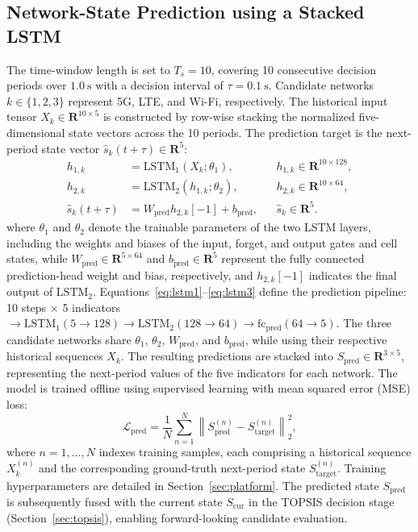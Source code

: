 \documentclass[preprint,12pt]{elsarticle}
\begin{document}
\subsection{Network-State Prediction using a Stacked LSTM}\label{sec:pred}

The time-window length is set to $T_s=10$, covering 10 consecutive decision periods over $1.0~\mathrm{s}$ with a decision interval of $\tau=0.1~\mathrm{s}$. Candidate networks $k\in\{1,2,3\}$ represent 5G, LTE, and Wi-Fi, respectively. The historical input tensor $X_k\in\mathbf{R}^{10\times5}$ is constructed by row-wise stacking the normalized five-dimensional state vectors across the 10 periods. The prediction target is the next-period state vector $\hat{s}_k(t+\tau)\in\mathbf{R}^5$:
\begin{align}
h_{1,k} &= \mathrm{LSTM}_1(X_k;\theta_1), && h_{1,k}\in\mathbf{R}^{10\times128}, \label{eq:lstm1}\\
h_{2,k} &= \mathrm{LSTM}_2(h_{1,k};\theta_2), && h_{2,k}\in\mathbf{R}^{10\times64}, \label{eq:lstm2}\\
\hat{s}_k(t+\tau) &= W_{\mathrm{pred}}h_{2,k}[-1]+b_{\mathrm{pred}}, && \hat{s}_k\in\mathbf{R}^5. \label{eq:lstm3}
\end{align}
where $\theta_1$ and $\theta_2$ denote the trainable parameters of the two LSTM layers, including the weights and biases of the input, forget, and output gates and cell states, while $W_{\mathrm{pred}}\in\mathbf{R}^{5\times64}$ and $b_{\mathrm{pred}}\in\mathbf{R}^5$ represent the fully connected prediction-head weight and bias, respectively, and $h_{2,k}[-1]$ indicates the final output of $\mathrm{LSTM}_2$. Equations~\eqref{eq:lstm1}--\eqref{eq:lstm3} define the prediction pipeline: 10 steps $\times$ 5 indicators $\rightarrow\mathrm{LSTM}_1(5\rightarrow128)\rightarrow\mathrm{LSTM}_2(128\rightarrow64)\rightarrow\mathrm{fc}_{\mathrm{pred}}(64\rightarrow5)$. The three candidate networks share $\theta_1$, $\theta_2$, $W_{\mathrm{pred}}$, and $b_{\mathrm{pred}}$, while using their respective historical sequences $X_k$. The resulting predictions are stacked into $S_{\mathrm{pred}}\in\mathbf{R}^{3\times5}$, representing the next-period values of the five indicators for each network. The model is trained offline using supervised learning with mean squared error (MSE) loss:
\begin{equation}
\mathcal{L}_{\mathrm{pred}} = \frac{1}{N}\sum_{n=1}^{N}\left\|S_{\mathrm{pred}}^{(n)} - S_{\mathrm{target}}^{(n)}\right\|_2^2,
\label{eq:loss_pred}
\end{equation}
where $n=1,\ldots,N$ indexes training samples, each comprising a historical sequence $X_k^{(n)}$ and the corresponding ground-truth next-period state $S_{\mathrm{target}}^{(n)}$. Training hyperparameters are detailed in Section~\ref{sec:platform}. The predicted state $S_{\mathrm{pred}}$ is subsequently fused with the current state $S_{\mathrm{cur}}$ in the TOPSIS decision stage (Section~\ref{sec:topsis}), enabling forward-looking candidate evaluation.
\end{document}
